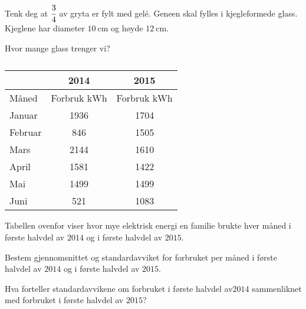 Tenk deg at $\cfrac{3}{4}$ av gryta er fylt med gelé. Geneen skal fylles i
kjegleformede glass. Kjeglene har diameter $\SI{10}{\cm}$ og høyde
$\SI{12}{\centi\metre}$.

\begin{oppgaver}
   Hvor mange glass trenger vi?
\end{oppgaver}


\Oppgave[3]

\begin{table}[H]
  \centering
  \caption{}
  \label{tab:Forkurs-1p-2p-laererutdanning-2016-V-U-oppgave-2-6}
  \begin{tabular}{| l | S[table-format=4.0] | S[table-format=4.0] |}
    \hline
    \Rowcolor \headerstrut & 2014 & 2015 \\ \hline
    \Rowcolor Måned \headerstrut & {Forbruk $\si{\kilo\watt\hour}$} & {Forbruk
    $\si{\kilo\watt\hour}$}   \\ \hline
     \Cellcolor Januar  & 1936 & 1704  \\ \hline
     \Cellcolor Februar & 846 & 1505   \\ \hline
     \Cellcolor Mars    & 2144 & 1610  \\ \hline
     \Cellcolor April   & 1581 & 1422  \\ \hline
     \Cellcolor Mai     & 1499 & 1499  \\ \hline
     \Cellcolor Juni    & 521 & 1083   \\ \hline
  \end{tabular}
\end{table}

Tabellen ovenfor viser hvor mye elektrisk energi en familie brukte hver måned
i første halvdel av $2014$ og i første halvdel av $2015$.

\begin{oppgaver}
     Bestem gjennomsnittet og standardavviket for forbruket per måned i
    første halvdel av $2014$ og i første halvdel av $2015$.
\end{oppgaver}

\begin{oppgaver}
     Hva forteller standardavvikene om forbruket i første halvdel
    av$2014$ sammenliknet med forbruket i første halvdel av $2015$?
\end{oppgaver}

